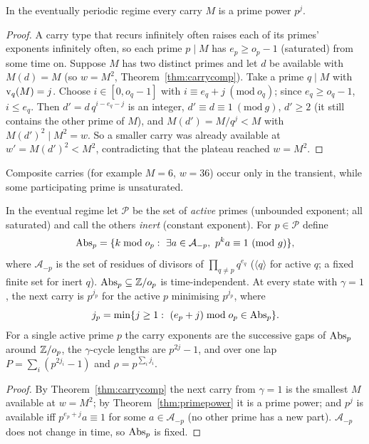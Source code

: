 \begin{theorem}\label{thm:primepower}
In the eventually periodic regime every carry \(M\) is a prime power \(p^j\).
\end{theorem}
\begin{proof}
A carry type that recurs infinitely often raises each of its primes' exponents infinitely often, so each prime \(p\mid M\) has \(e_p\ge o_p-1\) (saturated) from some time on. Suppose \(M\) has two distinct primes and let \(d\) be available with \(M(d)=M\) (so \(w=M^2\), Theorem~\ref{thm:carrycomp}). Take a prime \(q\mid M\) with \(\operatorname{v}_q(M)=j\). Choose \(i\in[0,o_q-1]\) with \(i\equiv e_q+j\ (\mathrm{mod}\ o_q)\); since \(e_q\ge o_q-1\), \(i\le e_q\). Then \(d'=d\,q^{i-e_q-j}\) is an integer, \(d'\equiv d\equiv1\ (\mathrm{mod}\ g)\), \(d'\ge2\) (it still contains the other prime of \(M\)), and \(M(d')=M/q^j<M\) with \(M(d')^2\mid M^2=w\). So a smaller carry was already available at \(w'=M(d')^2<M^2\), contradicting that the plateau reached \(w=M^2\).
\end{proof}

Composite carries (for example \(M=6\), \(w=36\)) occur only in the transient, while some participating prime is unsaturated.

\begin{theorem}\label{thm:odometer}
In the eventual regime let \(\mathcal P\) be the set of \emph{active} primes (unbounded exponent; all saturated) and call the others \emph{inert} (constant exponent). For \(p\in\mathcal P\) define
\[
\operatorname{Abs}_p=\{k\bmod o_p:\ \exists a\in\mathcal A_{-p},\ p^ka\equiv1\ (\mathrm{mod}\ g)\},
\]
where \(\mathcal A_{-p}\) is the set of residues of divisors of \(\prod_{q\ne p}q^{e_q}\) (\(\langle q\rangle\) for active \(q\); a fixed finite set for inert \(q\)). \(\operatorname{Abs}_p\subseteq\mathbb{Z}/o_p\) is time-independent. At every state with \(\gamma=1\), the next carry is \(p^{j_p}\) for the active \(p\) minimising \(p^{j_p}\), where
\[
j_p=\min\{j\ge1:\ (e_p+j)\bmod o_p\in\operatorname{Abs}_p\}.
\]
For a single active prime \(p\) the carry exponents are the successive gaps of \(\operatorname{Abs}_p\) around \(\mathbb{Z}/o_p\), the \(\gamma\)-cycle lengths are \(p^{2j}-1\), and over one lap \(P=\sum_i(p^{2j_i}-1)\) and \(\rho=p^{\sum_ij_i}\).
\end{theorem}
\begin{proof}
By Theorem~\ref{thm:carrycomp} the next carry from \(\gamma=1\) is the smallest \(M\) available at \(w=M^2\); by Theorem~\ref{thm:primepower} it is a prime power; and \(p^j\) is available iff \(p^{e_p+j}a\equiv1\) for some \(a\in\mathcal A_{-p}\) (no other prime has a new part). \(\mathcal A_{-p}\) does not change in time, so \(\operatorname{Abs}_p\) is fixed.
\end{proof}

